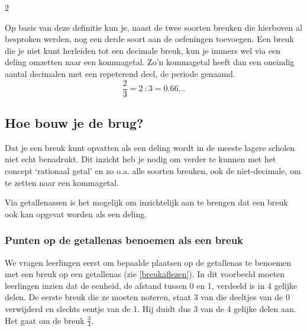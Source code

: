 \begin{multicols}{2}

Op basis van deze definitie kun je, naast de twee soorten breuken die hierboven al besproken werden, nog een derde soort aan de oefeningen toevoegen.
Een breuk die je niet kunt herleiden tot een decimale breuk, kun je immers wel via een deling omzetten naar een kommagetal.
Zo'n kommagetal heeft dan een oneindig aantal decimalen met een repeterend deel, de periode genaamd.
\[
\frac{2}{3} = 2\ :3 = \num{0.66}\ldots
\]

\subsection{Hoe bouw je de brug?}

Dat je een breuk kunt opvatten als een deling wordt in de meeste lagere scholen niet echt benadrukt.
Dit inzicht heb je nodig om verder te kunnen met het concept `rationaal getal' en zo o.a. alle soorten breuken, ook de niet-decimale, om te zetten naar een kommagetal.

Via getallenassen is het mogelijk om inzichtelijk aan te brengen dat een breuk ook kan opgevat worden als een deling.

\subsubsection*{Punten op de getallenas benoemen als een breuk}
We vragen leerlingen eerst om bepaalde plaatsen op de getallenas te benoemen met een breuk op een getallenas (zie \autoref{breukaflezen}).
In dit voorbeeld moeten leerlingen inzien dat de eenheid, de afstand tussen 0 en 1, verdeeld is in 4 gelijke delen.
De eerste breuk die ze moeten noteren, staat 3 van die deeltjes van de 0 verwijderd en slechts eentje van de 1.
Hij duidt dus 3 van de 4 gelijke delen aan.
Het gaat om de breuk \(\frac{3}{4}\).
\end{multicols}

